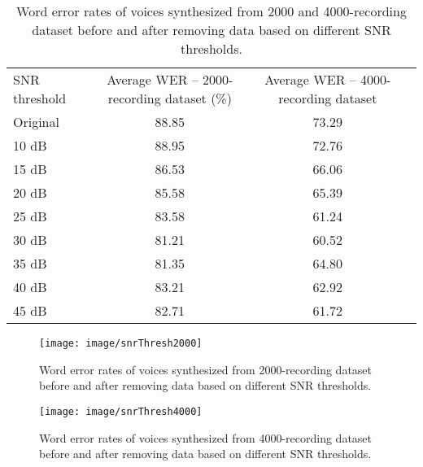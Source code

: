 \documentclass[12pt]{article}
\begin{document}
\begin{table}[]
\begin{center}
\caption{Word error rates of voices synthesized from 2000 and 4000-recording dataset before and after removing data based on different SNR thresholds.}
\label{tab_werSnrThresh}
\vspace{3mm}
\begin{tabular}{lccc}
\hline
SNR threshold & Average WER – 2000-recording dataset (\%) & Average WER – 4000-recording dataset\\
\cmidrule(l{0pt}r{2pt}){1-1}\cmidrule(l{0pt}r{2pt}){2-2}\cmidrule(l{0pt}r{2pt}){3-3}
Original & 88.85 & 73.29\\
10 dB    & 88.95 & 72.76\\
15 dB    & 86.53 & 66.06\\
20 dB    & 85.58 & 65.39\\
25 dB    & 83.58 & 61.24\\
30 dB    & 81.21 & 60.52\\
35 dB    & 81.35 & 64.80\\
40 dB    & 83.21 & 62.92\\
45 dB    & 82.71 & 61.72\\
\hline
\end{tabular}
\end{center}
\end{table}

\begin{figure}[t]
\begin{center}
\texttt{[image: image/snrThresh2000]}
\end{center}
\vspace{-0.3cm}
\caption[Word error rates of voices synthesized from 2000-recording dataset before and after removing data based on different SNR thresholds.]{Word error rates of voices synthesized from 2000-recording dataset before and after removing data based on different SNR thresholds.}
\label{fig_snrThresh2000}
\end{figure}

\begin{figure}[t]
\begin{center}
\texttt{[image: image/snrThresh4000]}
\end{center}
\vspace{-0.3cm}
\caption[Word error rates of voices synthesized from 4000-recording dataset before and after removing data based on different SNR thresholds.]{Word error rates of voices synthesized from 4000-recording dataset before and after removing data based on different SNR thresholds.}
\label{fig_snrThresh4000}
\end{figure}
\end{document}
